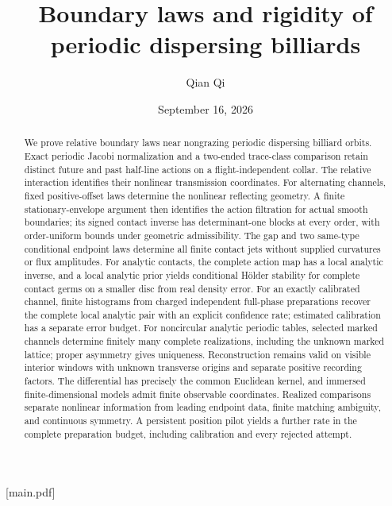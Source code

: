 
[main.pdf]
\title[Boundary laws and periodic rigidity]{Boundary laws and rigidity of periodic dispersing billiards}
\author{Qian Qi}
\date{September 16, 2026}


\begin{abstract}
We prove relative boundary laws near nongrazing periodic dispersing
billiard orbits.  Exact periodic Jacobi normalization and a two-ended
trace-class comparison retain distinct future and past half-line actions
on a flight-independent collar.  The relative interaction identifies their
nonlinear transmission coordinates.  For alternating channels, fixed
positive-offset laws determine the nonlinear reflecting geometry.
A finite stationary-envelope argument then identifies the action filtration
for actual smooth boundaries; its signed contact inverse has determinant-one
blocks at every order, with order-uniform bounds under geometric
admissibility.  The gap and two same-type conditional endpoint laws determine
all finite contact jets without supplied curvatures or flux amplitudes.
For analytic contacts, the complete action map has a local analytic inverse,
and a local analytic prior yields conditional H\"older stability for complete
contact germs on a smaller disc from real density error.
For an exactly calibrated channel, finite histograms from charged independent
full-phase preparations recover the complete local analytic pair with an
explicit confidence rate; estimated calibration has a separate error budget.
For noncircular analytic periodic tables, selected marked channels determine
finitely many complete realizations, including the unknown marked lattice;
proper asymmetry gives uniqueness.  Reconstruction remains valid on visible
interior windows with unknown transverse origins and separate positive
recording factors.  The differential has precisely the common Euclidean
kernel, and immersed finite-dimensional models admit finite observable
coordinates.  Realized comparisons separate nonlinear information from
leading endpoint data, finite matching ambiguity, and continuous symmetry.
A persistent position pilot yields a further rate in the complete
preparation budget, including calibration and every rejected attempt.
\end{abstract}
\maketitle
\enlargethispage{2pt}
\setcounter{tocdepth}{1}
\tableofcontents


